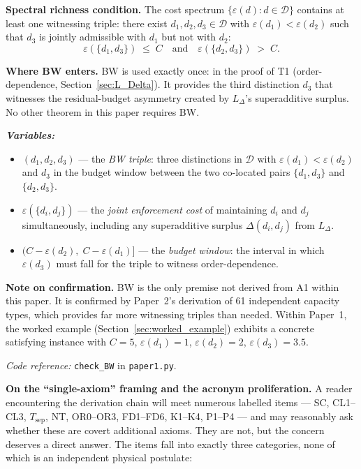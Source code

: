 \documentclass[11pt]{article}
\theoremstyle{remark}
\newenvironment{varlist}{\begin{itemize}[nosep,leftmargin=2em]}{\end{itemize}}
\newcommand{\coderef}[2]{\smallskip\noindent\textit{Code reference:} \texttt{#1} in \texttt{#2}.}
\begin{document}
\begin{tcolorbox}[defbox, title={Richness Premise BW (Budget Window)}]
\label{box:BW_formal}

\textbf{Spectral richness condition.}
The cost spectrum $\{\varepsilon(d) : d \in \mathcal{D}\}$ contains at least one witnessing triple: there exist $d_1, d_2, d_3 \in \mathcal{D}$ with $\varepsilon(d_1) < \varepsilon(d_2)$ such that $d_3$ is jointly admissible with $d_1$ but not with $d_2$:
\[
\varepsilon(\{d_1, d_3\}) \;\le\; C \quad\text{and}\quad \varepsilon(\{d_2, d_3\}) \;>\; C.
\]

\textbf{Where BW enters.}
BW is used exactly once: in the proof of T1 (order-dependence, Section~\ref{sec:L_Delta}).  It provides the third distinction $d_3$ that witnesses the residual-budget asymmetry created by $L_\Delta$'s superadditive surplus.  No other theorem in this paper requires BW.

\smallskip\noindent\textbf{\textit{Variables:}}
\begin{varlist}
\item $(d_1, d_2, d_3)$ --- the \emph{BW triple}: three distinctions in $\mathcal{D}$ with $\varepsilon(d_1) < \varepsilon(d_2)$ and $d_3$ in the budget window between the two co-located pairs $\{d_1, d_3\}$ and $\{d_2, d_3\}$.
\item $\varepsilon(\{d_i, d_j\})$ --- the \emph{joint enforcement cost} of maintaining $d_i$ and $d_j$ simultaneously, including any superadditive surplus $\Delta(d_i, d_j)$ from $L_\Delta$.
\item $(C - \varepsilon(d_2),\; C - \varepsilon(d_1)]$ --- the \emph{budget window}: the interval in which $\varepsilon(d_3)$ must fall for the triple to witness order-dependence.
\end{varlist}

\smallskip\noindent\textbf{Note on confirmation.}
BW is the only premise not derived from A1 within this paper.  It is confirmed by Paper~2's derivation of 61 independent capacity types, which provides far more witnessing triples than needed.  Within Paper~1, the worked example (Section~\ref{sec:worked_example}) exhibits a concrete satisfying instance with $C = 5$, $\varepsilon(d_1) = 1$, $\varepsilon(d_2) = 2$, $\varepsilon(d_3) = 3.5$.

\coderef{check\_BW}{paper1.py}
\end{tcolorbox}

\smallskip\noindent\textbf{On the ``single-axiom'' framing and the acronym proliferation.}
A reader encountering the derivation chain will meet numerous labelled items --- SC, CL1--CL3, $T_{\mathrm{sep}}$, NT, OR0--OR3, FD1--FD6, K1--K4, P1--P4 --- and may reasonably ask whether these are covert additional axioms.  They are not, but the concern deserves a direct answer.  The items fall into exactly three categories, none of which is an independent physical postulate:
\end{document}
